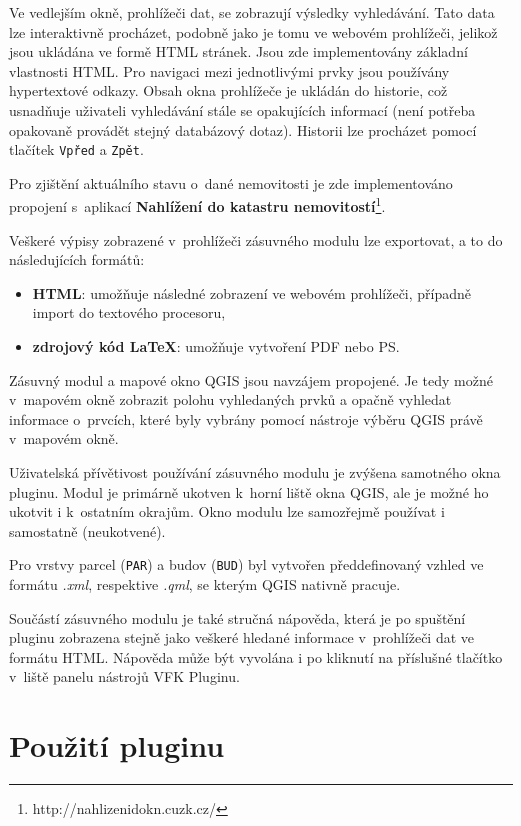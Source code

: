 \documentclass[a4paper,12pt,oneside]{book}
\newcommand{\latex}{\LaTeX}
\begin{document}
Ve vedlejším okně, prohlížeči dat, se zobrazují výsledky vyhledávání. Tato data lze interaktivně procházet, podobně jako je tomu ve webovém prohlížeči, jelikož jsou ukládána ve formě HTML stránek. Jsou zde implementovány základní vlastnosti HTML. Pro navigaci mezi jednotlivými prvky jsou používány hypertextové odkazy. Obsah okna prohlížeče je ukládán do historie, což usnadňuje uživateli vyhledávání stále se opakujících informací (není potřeba opakovaně provádět stejný databázový dotaz). Historii lze procházet pomocí tlačítek \texttt{Vpřed} a \texttt{Zpět}.

Pro zjištění aktuálního stavu o~dané nemovitosti je zde implementováno propojení s~aplikací \textbf{Nahlížení do katastru nemovitostí}\footnote{http://nahlizenidokn.cuzk.cz/}.

Veškeré výpisy zobrazené v~prohlížeči zásuvného modulu lze exportovat, a to do následujících formátů:

\begin{itemize}
 \item \textbf{HTML}: umožňuje následné zobrazení ve webovém prohlížeči, případně import do textového procesoru,
 \item \textbf{zdrojový kód \latex}: umožňuje vytvoření PDF nebo PS.
\end{itemize}

Zásuvný modul a mapové okno QGIS jsou navzájem propojené. Je tedy možné v~mapovém okně zobrazit polohu vyhledaných prvků a opačně vyhledat informace o~prvcích, které byly vybrány pomocí nástroje výběru QGIS právě v~mapovém okně.

Uživatelská přívětivost používání zásuvného modulu je zvýšena  samotného okna pluginu. Modul je primárně ukotven k~horní liště okna QGIS, ale je možné ho ukotvit i k~ostatním okrajům. Okno modulu lze samozřejmě používat i samostatně (neukotvené).

Pro vrstvy parcel (\texttt{PAR}) a budov (\texttt{BUD}) byl vytvořen předdefinovaný vzhled ve formátu \textit{.xml}, respektive \textit{.qml}, se kterým QGIS nativně pracuje. 

Součástí zásuvného modulu je také stručná nápověda, která je po spuštění pluginu zobrazena stejně jako veškeré hledané informace v~prohlížeči dat ve formátu HTML. Nápověda může být vyvolána i po kliknutí na příslušné tlačítko v~liště panelu nástrojů VFK Pluginu. \cite{cvut_vfkPlugin}

\newpage
\section{Použití pluginu}
\end{document}
